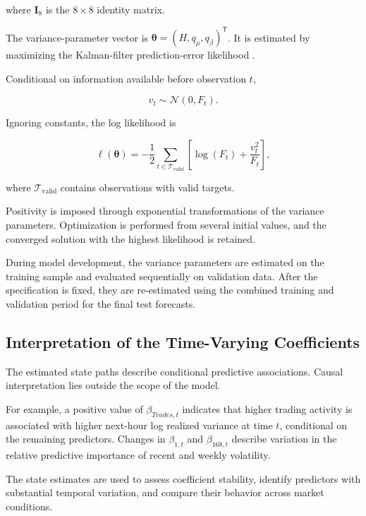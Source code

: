 where \(\mathbf{I}_8\) is the \(8\times8\) identity matrix.

The variance-parameter vector is
\(\boldsymbol{\theta}=(H,q_{\mu},q_{\beta})^{\mathsf{T}}\).
It is estimated by maximizing the Kalman-filter
prediction-error likelihood \citep{durbin2012}.

Conditional on information available before observation \(t\),

\begin{equation}
v_t
\sim
\mathcal{N}(0,F_t).
\label{eq:innovation-distribution}
\end{equation}

Ignoring constants, the log likelihood is

\begin{equation}
\ell
\left(
\boldsymbol{\theta}
\right)
=
-\frac{1}{2}
\sum_{t \in \mathcal{T}_{\mathrm{valid}}}
\left[
\log(F_t)
+
\frac{v_t^2}{F_t}
\right],
\label{eq:kalman-log-likelihood}
\end{equation}

where \(\mathcal{T}_{\mathrm{valid}}\) contains observations
with valid targets.

Positivity is imposed through exponential transformations of
the variance parameters. Optimization is performed from
several initial values, and the converged solution with the
highest likelihood is retained.

During model development, the variance parameters are estimated
on the training sample and evaluated sequentially on
validation data. After the specification is fixed, they are
re-estimated using the combined training and validation
period for the final test forecasts.

\subsection{Interpretation of the Time-Varying Coefficients}

The estimated state paths describe conditional predictive
associations. Causal interpretation lies outside the scope of
the model.

For example, a positive value of \(\beta_{Trades,t}\) indicates
that higher trading activity is associated with higher
next-hour log realized variance at time \(t\), conditional on
the remaining predictors. Changes in \(\beta_{1,t}\) and
\(\beta_{168,t}\) describe variation in the relative
predictive importance of recent and weekly volatility.

The state estimates are used to assess coefficient stability,
identify predictors with substantial temporal variation, and
compare their behavior across market conditions.

